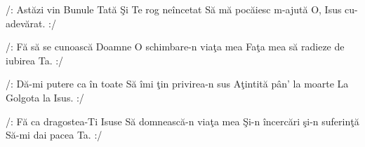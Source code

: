
\beginverse
/: Astăzi vin Bunule Tată
Şi Te rog neîncetat
Să mă pocăiesc m-ajută
O, Isus cu-adevărat. :/
\endverse

\beginchorus
/: Fă să se cunoască Doamne
O schimbare-n viaţa mea
Faţa mea să radieze de iubirea Ta. :/
\endchorus

\beginverse
/: Dă-mi putere ca în toate
Să îmi ţin privirea-n sus
Aţintită pân' la moarte
La Golgota la Isus. :/
\endverse

\beginverse
/: Fă ca dragostea-Ti Isuse
Să domnească-n viaţa mea
Şi-n încercări şi-n suferinţă
Să-mi dai pacea Ta. :/
\endverse

\endsong